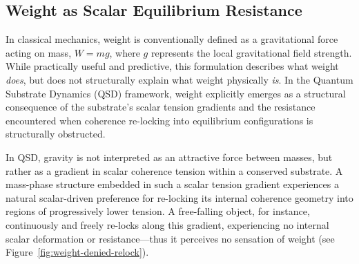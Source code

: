 \documentclass[preprints,article,submit,pdftex,moreauthors]{Definitions/mdpi}
\begin{document}
\subsection{Weight as Scalar Equilibrium Resistance}

In classical mechanics, weight is conventionally defined as a gravitational force acting on mass, \(W = mg\), where \(g\) represents the local gravitational field strength. While practically useful and predictive, this formulation describes what weight \emph{does}, but does not structurally explain what weight physically \emph{is}. In the Quantum Substrate Dynamics (QSD) framework, weight explicitly emerges as a structural consequence of the substrate’s scalar tension gradients and the resistance encountered when coherence re-locking into equilibrium configurations is structurally obstructed.

In QSD, gravity is not interpreted as an attractive force between masses, but rather as a gradient in scalar coherence tension within a conserved substrate. A mass-phase structure embedded in such a scalar tension gradient experiences a natural scalar-driven preference for re-locking its internal coherence geometry into regions of progressively lower tension. A free-falling object, for instance, continuously and freely re-locks along this gradient, experiencing no internal scalar deformation or resistance—thus it perceives no sensation of weight (see Figure~\ref{fig:weight-denied-relock}).
\end{document}
